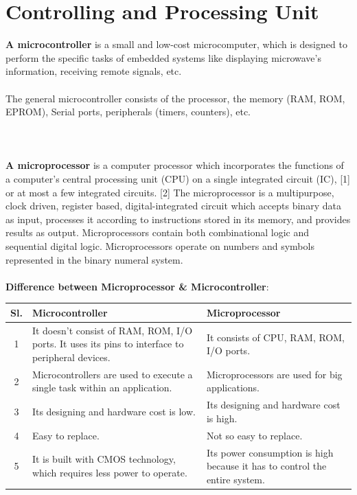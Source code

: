 \section{Controlling and Processing Unit}

\textbf{A microcontroller} is a small and low-cost microcomputer, which is designed to perform the specific tasks of embedded systems like displaying microwave’s information, receiving remote signals, etc.
\\
\\
The general microcontroller consists of the processor, the memory (RAM, ROM, EPROM), Serial ports, peripherals (timers, counters), etc.
\\
\\
\\
\\
\textbf{A microprocessor} is a computer processor which incorporates the functions of a computer's central processing unit (CPU) on a single integrated circuit (IC), [1] or at most a few integrated circuits. [2] The microprocessor is a multipurpose, clock driven, register based, digital-integrated circuit which accepts binary data as input, processes it according to instructions stored in its memory, and provides results as output. Microprocessors contain both combinational logic and sequential digital logic. Microprocessors operate on numbers and symbols represented in the binary numeral system.
\\
\\
\textbf{Difference between Microprocessor \& Microcontroller}:

\begin{center}
 \begin{tabular}{| c |  p{6cm} | p{6cm} |} 
 \hline
 Sl. & Microcontroller & Microprocessor \\ [0.5ex] 
 \hline\hline
 1 & It doesn’t consist of RAM, ROM, I/O ports. It uses its pins to interface to peripheral devices. & It consists of CPU, RAM, ROM, I/O ports. \\ 
 \hline
 2 & Microcontrollers are used to execute a single task within an application. &  Microprocessors are used for big applications. \\
 \hline
 3 & Its designing and hardware cost is low. & Its designing and hardware cost is high. \\
 \hline
 4 & Easy to replace. & Not so easy to replace. \\
 \hline
 5 & It is built with CMOS technology, which requires less power to operate. & Its power consumption is high because it has to control the entire system. \\
 \hline
\end{tabular}
\end{center}

